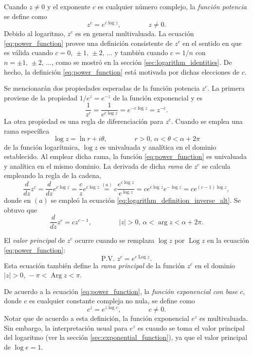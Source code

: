 \documentclass[a4paper]{report}
\DeclareMathOperator{\Arg}{Arg}
\DeclareMathOperator{\Log}{Log}
\begin{document}
Cuando \(z\neq0\) y el exponente \(c\) es cualquier número complejo, la \emph{función potencia} se define como 
\begin{equation}\label{eq:power_function}
 z^c=e^{c\log z},
 \qquad\qquad 
 z\neq0. 
\end{equation}
Debido al logaritmo, \(z^c\) es en general multivaluada. La ecuación \ref{eq:power_function} provee una definición consistente de \(z^c\) en el sentido en que es válida cuando \(c=0,\,\pm1,\,\pm2,\,\dots\) y también cuando \(c=1/n\) con \(n=\pm1,\,\pm2,\,\dots\), como se mostró en la sección \ref{sec:logarithm_identities}. De hecho, la definición \ref{eq:power_function} está motivada por dichas elecciones de \(c\).

Se mencionarán dos propiedades esperadas de la función potencia \(z^c\). La primera proviene de la propiedad \(1/e^z=e^{-z}\) de la función exponencial y es
\[
 \frac{1}{z^c}=\frac{1}{e^{c\log z}}=e^{-c\log z}=z^{-c}.
\]
La otra propiedad es una regla de diferenciación para \(z^c\). Cuando se emplea una rama específica
\[
 \log z=\ln r+i\theta,\qquad\qquad
 r>0,\,\alpha<\theta<\alpha+2\pi
\]
de la función logarítmica, \(\log z\) es univaluada y analítica en el dominio establecido. Al emplear dicha rama, la función \ref{eq:power_function} es univaluada y analítica en el mismo dominio. La derivada de dicha \emph{rama} de \(z^c\) se calcula empleando la regla de la cadena,
\[
 \frac{d}{dz}z^c=\frac{d}{dz}e^{c\log z}=\frac{c}{z}e^{c\log z}\overset{(a)}{=}c\frac{e^{c\log z}}{e^{\log z}}=ce^{c\log z}e^{-\log z}=ce^{(c-1)\log z},
\]
donde en \((a)\) se empleó la ecuación \ref{eq:logarithm_definition_inverse_alt}. Se obtuvo que 
\[
 \frac{d}{dz}z^c=cz^{c-1},
 \qquad\qquad
 |z|>0,\,\alpha<\arg z<\alpha+2\pi.
\]

El \emph{valor principal} de \(z^c\) ocurre cuando se remplaza \(\log z\) por \(\Log z\) en la ecuación \ref{eq:power_function}:
\begin{equation}\label{eq:power_function_pv}
 \textrm{P.V. }z^c=e^{c\Log z}. 
\end{equation}
Esta ecuación también define la \emph{rama principal} de la función \(z^c\) en el dominio \(|z|>0,\,-\pi<\Arg z<\pi\). 

De acuerdo a la ecuación \ref{eq:power_function}, la \emph{función exponencial con base} \(c\), donde \(c\) es cualquier constante compleja no nula, se define como
\[
 c^z=e^{z\log c},
 \qquad\qquad 
 c\neq0. 
\]
Notar que de acuerdo a esta definición, la función exponencial \(e^z\) es multivaluada. Sin embargo, la interpretación usual para \(e^z\) es cuando se toma el valor principal del logaritmo (ver la sección \ref{sec:exponential_function}), ya que el valor principal de \(\log e=1\).
\end{document}
